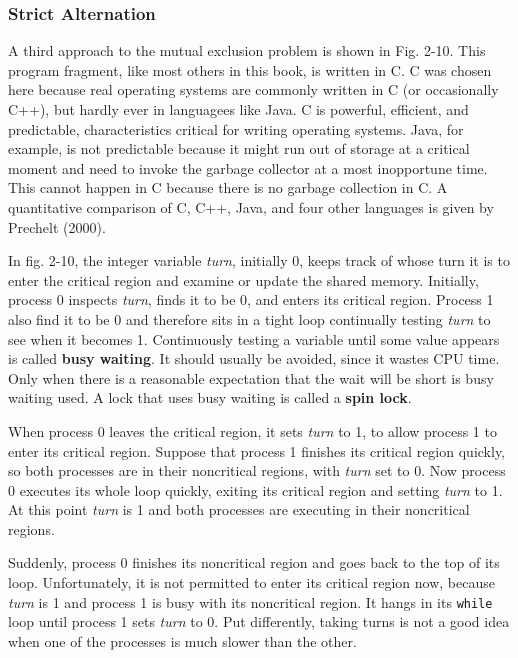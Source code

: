 \documentclass{book}
\newcommand {\kw}  [1] {\textbf{#1}}
\newcommand {\sys} [1] {\textsl{#1}}
\newcommand {\cmd} [1] {\texttt{#1}}
\begin{document}
\subsubsection*{Strict Alternation}
A third approach to the mutual exclusion problem is shown in Fig. 2-10.
This program fragment, like most others in this book, is written in C.
C was chosen here because real operating systems are commonly written in C (or occasionally C++),
but hardly ever in languagees like Java.
C is powerful, efficient, and predictable, characteristics critical for writing operating systems.
Java, for example, is not predictable because it might run out of storage at a critical moment 
and need to invoke the garbage collector at a most inopportune time.
This cannot happen in C because there is no garbage collection in C.
A quantitative comparison of C, C++, Java, and four other languages is given by Prechelt (2000).

In fig. 2-10, the integer variable \sys{turn}, initially 0, keeps track of whose turn it is to enter the critical region
and examine or update the shared memory.
Initially, process 0 inspects \sys{turn}, finds it to be 0, and enters its critical region.
Process 1 also find it to be 0 and therefore sits in a tight loop continually testing \sys{turn} to see when it becomes 1.
Continuously testing a variable until some value appears is called \kw{busy waiting}.
It should usually be avoided, since it wastes CPU time.
Only when there is a reasonable expectation that the wait will be short is busy waiting used.
A lock that uses busy waiting is called a \kw{spin lock}.

When process 0 leaves the critical region, it sets \sys{turn} to 1, to allow process 1 to enter its critical region.
Suppose that process 1 finishes its critical region quickly, so both processes are in their noncritical regions,
with \sys{turn} set to 0.
Now process 0 executes its whole loop quickly, exiting its critical region and setting \sys{turn} to 1.
At this point \sys{turn} is 1 and both processes are executing in their noncritical regions.

Suddenly, process 0 finishes its noncritical region and goes back to the top of its loop.
Unfortunately, it is not permitted to enter its critical region now, 
because \sys{turn} is 1 and process 1 is busy with its noncritical region.
It hangs in its \cmd{while} loop until process 1 sets \sys{turn} to 0.
Put differently, taking turns is not a good idea when one of the processes is much slower than the other.
\end{document}
